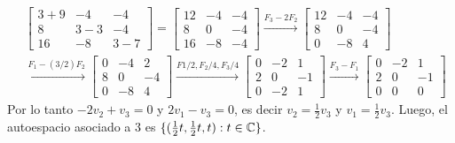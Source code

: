 \begin{enumerate}[resume,topsep=6pt,itemsep=.4cm]
    \begin{align*}
        &\begin{bmatrix} 3+9 & -4 & -4\\ 8 & 3-3 & -4\\ 16 & -8 & 3-7 \end{bmatrix} =  \begin{bmatrix} 12 & -4 & -4\\ 8 & 0 & -4\\ 16 & -8 & -4 \end{bmatrix} \stackrel{F_3-2F_2}{\longrightarrow} \begin{bmatrix} 12 & -4 & -4\\ 8 & 0 & -4\\ 0 & -8 & 4 \end{bmatrix} \\
        & \stackrel{F_1-(3/2)F_2}{\longrightarrow} \begin{bmatrix} 0 & -4 & 2\\ 8 & 0 & -4\\ 0 & -8 & 4 \end{bmatrix} \stackrel{F1/2, F_2/4, F_3/4}{\longrightarrow} \begin{bmatrix} 0 & -2 & 1\\ 2 & 0 & -1\\ 0 & -2 & 1 \end{bmatrix}  \stackrel{F_3-F_1}{\longrightarrow} \begin{bmatrix} 0 & -2 & 1\\ 2 & 0 & -1\\ 0 & 0 & 0 \end{bmatrix}
    \end{align*}
    Por lo tanto $-2v_2 + v_3 =0$ y $2v_1 -v_3=0$, es decir $v_2 = \frac12 v_3$ y $v_1 = \frac12 v_3$. Luego, el autoespacio asociado a $3$ es $\{(\frac12t,\frac12t,t): t \in \mathbb C\}$.



\end{enumerate}
